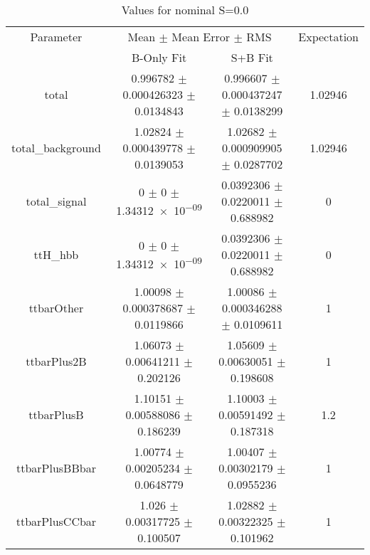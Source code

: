 \begin{table}
\centering
\caption{Values for nominal S=0.0}
\begin{tabular}{cccc}
\toprule
Parameter & \multicolumn{2}{c}{Mean $\pm$ Mean Error $\pm$ RMS} & Expectation\\
 & B-Only Fit & S+B Fit & \\
\midrule
total & \num{0.996782} $\pm$ \num{0.000426323} $\pm$ \num{0.0134843} & \num{0.996607} $\pm$ \num{0.000437247} $\pm$ \num{0.0138299} & \num{1.02946}\\
total\_background & \num{1.02824} $\pm$ \num{0.000439778} $\pm$ \num{0.0139053} & \num{1.02682} $\pm$ \num{0.000909905} $\pm$ \num{0.0287702} & \num{1.02946}\\
total\_signal & \num{0} $\pm$ \num{0} $\pm$ \num{1.34312e-09} & \num{0.0392306} $\pm$ \num{0.0220011} $\pm$ \num{0.688982} & \num{0}\\
ttH\_hbb & \num{0} $\pm$ \num{0} $\pm$ \num{1.34312e-09} & \num{0.0392306} $\pm$ \num{0.0220011} $\pm$ \num{0.688982} & \num{0}\\
ttbarOther & \num{1.00098} $\pm$ \num{0.000378687} $\pm$ \num{0.0119866} & \num{1.00086} $\pm$ \num{0.000346288} $\pm$ \num{0.0109611} & \num{1}\\
ttbarPlus2B & \num{1.06073} $\pm$ \num{0.00641211} $\pm$ \num{0.202126} & \num{1.05609} $\pm$ \num{0.00630051} $\pm$ \num{0.198608} & \num{1}\\
ttbarPlusB & \num{1.10151} $\pm$ \num{0.00588086} $\pm$ \num{0.186239} & \num{1.10003} $\pm$ \num{0.00591492} $\pm$ \num{0.187318} & \num{1.2}\\
ttbarPlusBBbar & \num{1.00774} $\pm$ \num{0.00205234} $\pm$ \num{0.0648779} & \num{1.00407} $\pm$ \num{0.00302179} $\pm$ \num{0.0955236} & \num{1}\\
ttbarPlusCCbar & \num{1.026} $\pm$ \num{0.00317725} $\pm$ \num{0.100507} & \num{1.02882} $\pm$ \num{0.00322325} $\pm$ \num{0.101962} & \num{1}\\
\bottomrule
\end{tabular}
\end{table}